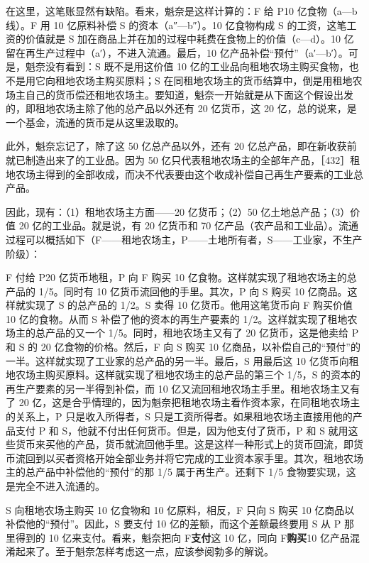 在这里，这笔账显然有缺陷。看来，魁奈是这样计算的：F 给 P10 亿食物（a—b 线）。F 用 10 亿原料补偿 S 的资本（a″—b″）。10 亿食物构成 S 的工资，这笔工资的价值就是 S 加在商品上并在加的过程中耗费在食物上的价值（c—d）。10 亿留在再生产过程中（a′），不进入流通。最后，10 亿产品补偿“预付”（a′—b′）。可是，魁奈没有看到：S 既不是用这价值 10 亿的工业品向租地农场主购买食物，也不是用它向租地农场主购买原料；S 在同租地农场主的货币结算中，倒是用租地农场主自己的货币偿还租地农场主。要知道，魁奈一开始就是从下面这个假设出发的，即租地农场主除了他的总产品以外还有 20 亿货币，这 20 亿，总的说来，是一个基金，流通的货币是从这里汲取的。

此外，魁奈忘记了，除了这 50 亿总产品以外，还有 20 亿总产品，即在新收获前就已制造出来了的工业品。因为 50 亿只代表租地农场主的全部年产品，［432］租地农场主得到的全部收成，而决不代表要由这个收成补偿自己再生产要素的工业总产品。

因此，现有：（1）租地农场主方面——20 亿货币；（2）50 亿土地总产品；（3）价值 20 亿的工业品。就是说，有 20 亿货币和 70 亿产品（农产品和工业品）。流通过程可以概括如下（F——租地农场主，P——土地所有者，S——工业家，不生产阶级）：

F 付给 P20 亿货币地租，P 向 F 购买 10 亿食物。这样就实现了租地农场主的总产品的 1/5。同时有 10 亿货币流回他的手里。其次，P 向 S 购买 10 亿商品。这样就实现了 S 的总产品的 1/2。S 卖得 10 亿货币。他用这笔货币向 F 购买价值 10 亿的食物。从而 S 补偿了他的资本的再生产要素的 1/2。这样就实现了租地农场主的总产品的又一个 1/5。同时，租地农场主又有了 20 亿货币，这是他卖给 P 和 S 的 20 亿食物的价格。然后，F 向 S 购买 10 亿商品，以补偿自己的“预付”的一半。这样就实现了工业家的总产品的另一半。最后，S 用最后这 10 亿货币向租地农场主购买原料。这样就实现了租地农场主的总产品的第三个 1/5，S 的资本的再生产要素的另一半得到补偿，而 10 亿又流回租地农场主手里。租地农场主又有了 20 亿，这是合乎情理的，因为魁奈把租地农场主看作资本家，在同租地农场主的关系上，P 只是收入所得者，S 只是工资所得者。如果租地农场主直接用他的产品支付 P 和 S，他就不付出任何货币。但是，因为他支付了货币，P 和 S 就用这些货币来买他的产品，货币就流回他手里。这是这样一种形式上的货币回流，即货币流回到以买者资格开始全部业务并将它完成的工业资本家手里。其次，租地农场主的总产品中补偿他的“预付”的那 1/5 属于再生产。还剩下 1/5 食物要实现，这是完全不进入流通的。


S 向租地农场主购买 10 亿食物和 10 亿原料，相反，F 只向 S 购买 10 亿商品以补偿他的“预付”。因此，S 要支付 10 亿的差额，而这个差额最终要用 S 从 P 那里得到的 10 亿来支付。看来，魁奈把向 F\textbf{支付}这 10 亿，同向 F\textbf{购买}10 亿产品混淆起来了。至于魁奈怎样考虑这一点，应该参阅勃多的解说。


